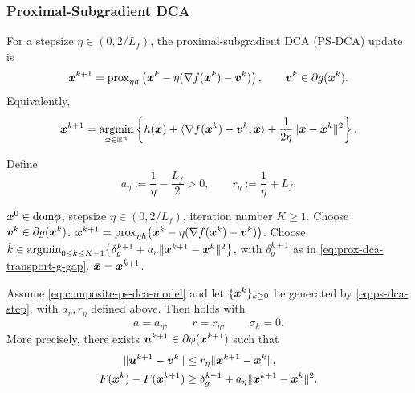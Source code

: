 \subsubsection{Proximal-Subgradient DCA}


For a stepsize $\eta\in(0,2/L_f)$, the proximal-subgradient DCA
(PS-DCA) update is
\begin{equation}
    \bm{x}^{k+1}
    =
    \mathrm{prox}_{\eta h}
    \left(
        \bm{x}^k-\eta(\nabla f(\bm{x}^k)-\bm{v}^k)
    \right),
    \qquad
    \bm{v}^k\in\partial g(\bm{x}^k).
    \label{eq:ps-dca-step}
\end{equation}
Equivalently,
\[
    \bm{x}^{k+1}
    =
    \operatorname*{\mathrm{argmin}}_{\bm{x}\in\mathbb{R}^n}
    \left\{
        h(\bm{x})
        +
        \langle \nabla f(\bm{x}^k)-\bm{v}^k,\bm{x}\rangle
        +
        \frac{1}{2\eta}\|\bm{x}-\bm{x}^k\|^2
    \right\}.
\]

Define
\[
    a_\eta:=\frac{1}{\eta}-\frac{L_f}{2}>0,
    \qquad
    r_\eta:=\frac{1}{\eta}+L_f .
\]

\begin{algorithm}[tbp]
    \caption{\textbf{Proximal-Subgradient DCA (PS-DCA)}}
    \label{alg:ps-dca}
    \begin{algorithmic}[1]
         $\bm{x}^0\in\mathrm{dom}\phi$, stepsize
        $\eta\in(0,2/L_f)$, iteration number $K\ge1$.
            \STATE Choose $\bm{v}^k\in\partial g(\bm{x}^k)$.
            \STATE
            $\bm{x}^{k+1}
            =\mathrm{prox}_{\eta h}
            \bigl(\bm{x}^k-\eta(\nabla f(\bm{x}^k)-\bm{v}^k)\bigr)$.
        \ENDFOR
        \STATE Choose
        $\hat k\in\operatorname*{\mathrm{argmin}}_{0\le k\le K-1}
        \bigl\{\delta_g^{k+1}+a_\eta\|\bm{x}^{k+1}-\bm{x}^k\|^2\bigr\}$,
        with $\delta_g^{k+1}$ as in
        \eqref{eq:prox-dca-transport-g-gap}.
         $\bar{\bm{x}}=\bm{x}^{\hat k+1}$.
    \end{algorithmic}
\end{algorithm}

\begin{lemma}
\label{lem:ps-dca-realization}
Assume \eqref{eq:composite-ps-dca-model} and let
$\{\bm{x}^k\}_{k\ge0}$ be generated by \eqref{eq:ps-dca-step}, with
$a_\eta,r_\eta$ defined above. Then 
holds with
\[
    a=a_\eta,
    \qquad
    r=r_\eta,
    \qquad
    \sigma_k=0 .
\]
More precisely, there exists
$\bm{u}^{k+1}\in\partial\phi(\bm{x}^{k+1})$ such that
\begin{align}
    \|\bm{u}^{k+1}-\bm{v}^k\|
    &\le
    r_\eta\|\bm{x}^{k+1}-\bm{x}^k\|,
    \label{eq:ps-dca-residual}
    \\
    F(\bm{x}^k)-F(\bm{x}^{k+1})
    &\ge
    \delta_g^{k+1}
    +
    a_\eta\|\bm{x}^{k+1}-\bm{x}^k\|^2 .
    \label{eq:ps-dca-descent}
\end{align}
\end{lemma}

